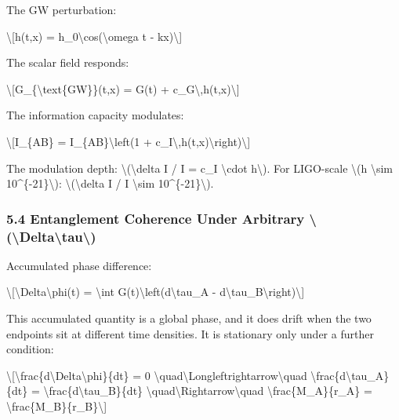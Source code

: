 \documentclass[
  10pt,
]{article}
\begin{document}
The GW perturbation:

\textbackslash{[}h(t,x) = h\_0\textbackslash cos(\textbackslash omega t
- kx)\textbackslash{]}

The scalar field responds:

\textbackslash{[}G\_\{\textbackslash text\{GW\}\}(t,x) = G(t) +
c\_G\textbackslash,h(t,x)\textbackslash{]}

The information capacity modulates:

\textbackslash{[}I\_\{AB\}\textquotesingle{} =
I\_\{AB\}\textbackslash left(1 +
c\_I\textbackslash,h(t,x)\textbackslash right)\textbackslash{]}

The modulation depth: \textbackslash(\textbackslash delta I / I = c\_I
\textbackslash cdot h\textbackslash). For LIGO-scale \textbackslash(h
\textbackslash sim 10\^{}\{-21\}\textbackslash):
\textbackslash(\textbackslash delta I / I \textbackslash sim
10\^{}\{-21\}\textbackslash).

\hypertarget{entanglement-coherence-under-arbitrary-deltatau}{%
\subsubsection{5.4 Entanglement Coherence Under Arbitrary
\textbackslash(\textbackslash Delta\textbackslash tau\textbackslash)}\label{entanglement-coherence-under-arbitrary-deltatau}}

Accumulated phase difference:

\textbackslash{[}\textbackslash Delta\textbackslash phi(t) =
\textbackslash int G(t)\textbackslash left(d\textbackslash tau\_A -
d\textbackslash tau\_B\textbackslash right)\textbackslash{]}

This accumulated quantity is a global phase, and it does drift when the
two endpoints sit at different time densities. It is stationary only
under a further condition:

\textbackslash{[}\textbackslash frac\{d\textbackslash Delta\textbackslash phi\}\{dt\}
= 0
\textbackslash quad\textbackslash Longleftrightarrow\textbackslash quad
\textbackslash frac\{d\textbackslash tau\_A\}\{dt\} =
\textbackslash frac\{d\textbackslash tau\_B\}\{dt\}
\textbackslash quad\textbackslash Rightarrow\textbackslash quad
\textbackslash frac\{M\_A\}\{r\_A\} =
\textbackslash frac\{M\_B\}\{r\_B\}\textbackslash{]}
\end{document}
